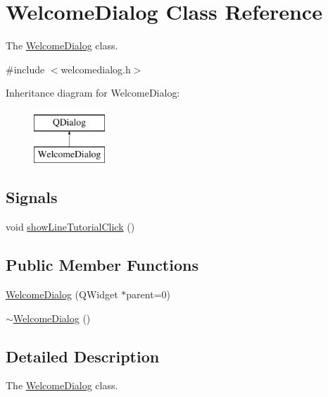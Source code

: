 \hypertarget{class_welcome_dialog}{}\section{Welcome\+Dialog Class Reference}
\label{class_welcome_dialog}


The \hyperlink{class_welcome_dialog}{Welcome\+Dialog} class.  




{\ttfamily \#include $<$welcomedialog.\+h$>$}

Inheritance diagram for Welcome\+Dialog\+:\begin{figure}[H]
\begin{center}
\leavevmode
\includegraphics[height=2.000000cm]{class_welcome_dialog}
\end{center}
\end{figure}
\subsection*{Signals}
\begin{DoxyCompactItemize}
\item 
void \hyperlink{class_welcome_dialog_a13b5b9dd60876c39de70703d75949710}{show\+Line\+Tutorial\+Click} ()
\end{DoxyCompactItemize}
\subsection*{Public Member Functions}
\begin{DoxyCompactItemize}
\item 
\hyperlink{class_welcome_dialog_a1841278dd21a0e135b6e14b65857d3bc}{Welcome\+Dialog} (Q\+Widget $\ast$parent=0)
\item 
\hyperlink{class_welcome_dialog_aff7416acdda782ac3196ae28ea2ebe80}{$\sim$\+Welcome\+Dialog} ()
\end{DoxyCompactItemize}


\subsection{Detailed Description}
The \hyperlink{class_welcome_dialog}{Welcome\+Dialog} class. 

